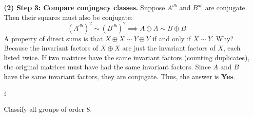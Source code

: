 \begin{solution}
\textbf{(2) Step 3: Compare conjugacy classes.}
Suppose $A^{db}$ and $B^{db}$ are conjugate. Then their squares must also be conjugate:
\[ (A^{db})^2 \sim (B^{db})^2 \implies A \oplus A \sim B \oplus B \]
A property of direct sums is that $X \oplus X \sim Y \oplus Y$ if and only if $X \sim Y$.
Why? Because the invariant factors of $X \oplus X$ are just the invariant factors of $X$, each listed twice. If two matrices have the same invariant factors (counting duplicates), the original matrices must have had the same invariant factors.
Since $A$ and $B$ have the same invariant factors, they are conjugate. Thus, the answer is \textbf{Yes}.
\end{solution}

\begin{exercise}
\l\label{2014:10}

\label{algebra:2014:10}Classify all groups of order 8.
\end{exercise}

